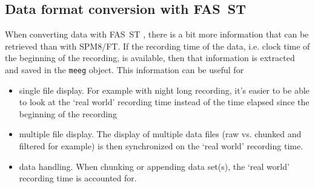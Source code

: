 \documentclass[a4paper,titlepage]{article}
\def\dblS{\hbox{S\hskip -4.5pt S}}
\def\dblSt{\hbox{S\hskip -6pt S}}
\newcommand{\bi}{\begin{itemize}}
\newcommand{\ei}{\end{itemize}}
\newcommand{\fasst}{FA\dblS T } 	%
\newcommand{\tfasst}{FA\dblSt T } %
\begin{document}


\subsection{Data format conversion with \tfasst}
\label{sec:dataconvert}

When converting data with \fasst, there is a bit more information that can be retrieved than with SPM8/FT. If the recording time of the data, i.e. clock time of the beginning of the recording, is available, then that information is extracted and saved in the {\tt meeg} object. This information can be useful for
\bi
\item single file display. For example with night long recording, it's easier to be able to look at the `real world' recording time instead of the time elapsed since the beginning of the recording
\item multiple file display. The display of multiple data files (raw vs. chunked and filtered for example) is then synchronized on the `real world' recording time.
\item data handling. When chunking or appending data set(s), the `real world' recording time is accounted for.
\ei
\end{document}
